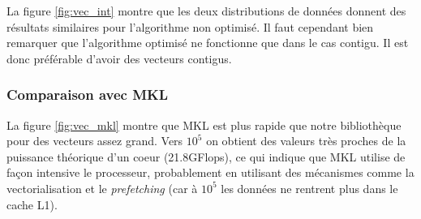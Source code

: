 La figure \ref{fig:vec_int} montre que les deux distributions de données donnent des résultats similaires pour l'algorithme non optimisé. Il faut cependant bien remarquer que l'algorithme optimisé ne fonctionne que dans le cas contigu. Il est donc préférable d'avoir des vecteurs contigus.
    
\subsubsection{Comparaison avec MKL}

La figure \ref{fig:vec_mkl} montre que MKL est plus rapide que notre bibliothèque pour des vecteurs assez grand. Vers $10^5$ on obtient des valeurs très proches de la puissance théorique d'un coeur (21.8GFlops), ce qui indique que MKL utilise de façon intensive le processeur, probablement en utilisant des mécanismes comme la vectorialisation et le \emph{prefetching} (car à $10^5$ les données ne rentrent plus dans le cache L1).